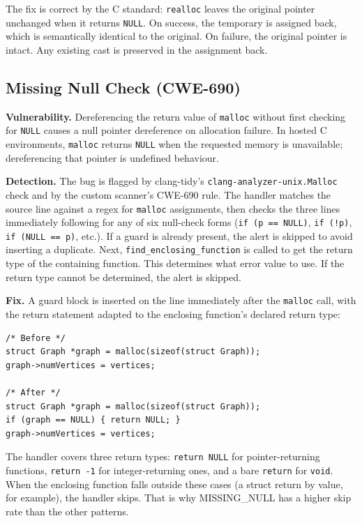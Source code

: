 The fix is correct by the C standard: \texttt{realloc} leaves the original pointer unchanged when it returns \texttt{NULL}. On success, the temporary is assigned back, which is semantically identical to the original. On failure, the original pointer is intact. Any existing cast is preserved in the assignment back.

\subsection{Missing Null Check (CWE-690)}

\textbf{Vulnerability.} Dereferencing the return value of \texttt{malloc} without first checking for \texttt{NULL} causes a null pointer dereference on allocation failure. In hosted C environments, \texttt{malloc} returns \texttt{NULL} when the requested memory is unavailable; dereferencing that pointer is undefined behaviour.

\textbf{Detection.} The bug is flagged by clang-tidy's \texttt{clang-analyzer-unix.Malloc} check and by the custom scanner's CWE-690 rule. The handler matches the source line against a regex for \texttt{malloc} assignments, then checks the three lines immediately following for any of six null-check forms (\texttt{if (p == NULL)}, \texttt{if (!p)}, \texttt{if (NULL == p)}, etc.). If a guard is already present, the alert is skipped to avoid inserting a duplicate. Next, \texttt{find\_enclosing\_function} is called to get the return type of the containing function. This determines what error value to use. If the return type cannot be determined, the alert is skipped.

\textbf{Fix.} A guard block is inserted on the line immediately after the \texttt{malloc} call, with the return statement adapted to the enclosing function's declared return type:

\begin{lstlisting}[caption={CWE-690 fix: null guard inserted after malloc}]
/* Before */
struct Graph *graph = malloc(sizeof(struct Graph));
graph->numVertices = vertices;

/* After */
struct Graph *graph = malloc(sizeof(struct Graph));
if (graph == NULL) { return NULL; }
graph->numVertices = vertices;
\end{lstlisting}

The handler covers three return types: \texttt{return NULL} for pointer-returning functions, \texttt{return -1} for integer-returning ones, and a bare \texttt{return} for \texttt{void}. When the enclosing function falls outside these cases (a struct return by value, for example), the handler skips. That is why MISSING\_NULL has a higher skip rate than the other patterns.

